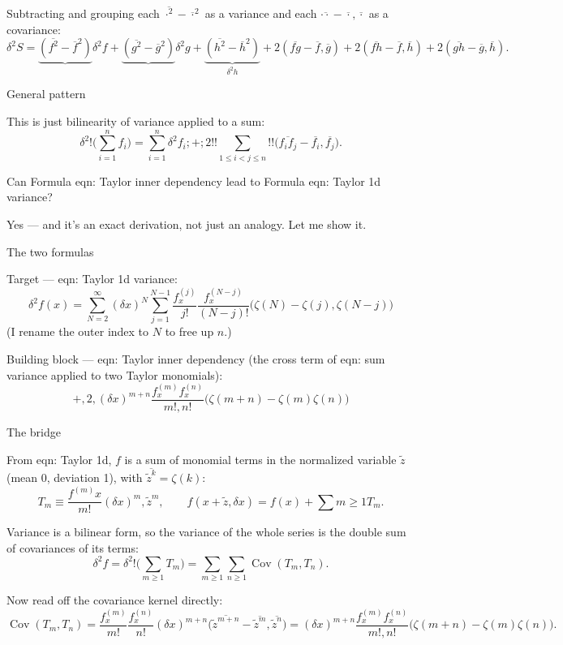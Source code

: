 \documentclass[twoside]{article}
\numberwithin{equation}{section}
\begin{document}
Subtracting and grouping each $\overline{\cdot^2}-\overline{\cdot}^2$ as a variance and each $\overline{\cdot\cdot}-\overline{\cdot},\overline{\cdot}$ as a covariance:
$$\delta^2 S = \underbrace{(\overline{f^2}-\overline{f}^2)}{\delta^2 f}+\underbrace{(\overline{g^2}-\overline{g}^2)}{\delta^2 g}+\underbrace{(\overline{h^2}-\overline{h}^2)}_{\delta^2 h} + 2(\overline{fg}-\overline{f},\overline{g})+2(\overline{fh}-\overline{f},\overline{h})+2(\overline{gh}-\overline{g},\overline{h}).$$

General pattern

This is just bilinearity of variance applied to a sum:
$$\delta^2!\Big(\sum_{i=1}^{n} f_i\Big) = \sum_{i=1}^{n}\delta^2 f_i ;+; 2!!\sum_{1\le i<j\le n}!!\big(\overline{f_i f_j} - \overline{f_i},\overline{f_j}\big).$$


Can Formula {eqn: Taylor inner dependency} lead to Formula {eqn: Taylor 1d variance}?

Yes — and it's an exact derivation, not just an analogy. Let me show it.

The two formulas

Target — eqn: Taylor 1d variance:
$$\delta^2 f(x) = \sum_{N=2}^{\infty} (\delta x)^N \sum_{j=1}^{N-1} \frac{f^{(j)}_x}{j!}\frac{f^{(N-j)}_x}{(N-j)!}\Big(\zeta(N) - \zeta(j),\zeta(N-j)\Big)$$
(I rename the outer index to $N$ to free up $n$.)

Building block — eqn: Taylor inner dependency (the cross term of eqn: sum variance applied to two Taylor monomials):
$$+,2,(\delta x)^{m+n}\frac{f^{(m)}_x f^{(n)}_x}{m!,n!}\big(\zeta(m+n) - \zeta(m)\zeta(n)\big)$$

The bridge

From eqn: Taylor 1d, $f$ is a sum of monomial terms in the normalized variable $\tilde z$ (mean 0, deviation 1), with $\overline{\tilde z^k} = \zeta(k)$:
$$T_m \equiv \frac{f^{(m)}x}{m!}(\delta x)^m,\tilde z^m, \qquad f(x+\tilde z,\delta x) = f(x) + \sum{m\ge 1} T_m .$$

Variance is a bilinear form, so the variance of the whole series is the double sum of covariances of its terms:
$$\delta^2 f = \delta^2!\Big(\sum_{m\ge1} T_m\Big) = \sum_{m\ge1}\sum_{n\ge1}\operatorname{Cov}(T_m,T_n).$$

Now read off the covariance kernel directly:
$$\operatorname{Cov}(T_m,T_n) = \frac{f^{(m)}_x}{m!}\frac{f^{(n)}_x}{n!}(\delta x)^{m+n}\big(\overline{\tilde z^{m+n}} - \overline{\tilde z^m},\overline{\tilde z^n}\big) = (\delta x)^{m+n}\frac{f^{(m)}_x f^{(n)}_x}{m!,n!}\big(\zeta(m+n) - \zeta(m)\zeta(n)\big).$$
\end{document}
